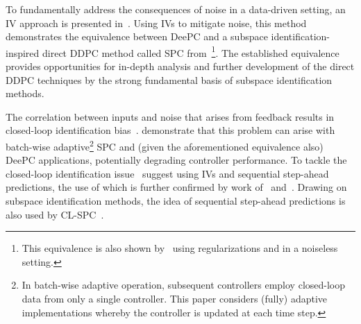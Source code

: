 To fundamentally address the consequences of noise in a data-driven setting, an \ac{IV} approach is presented in~\cite{vanWingerden2022}. %
Using \acs{IVs} to mitigate noise, this method %
demonstrates the equivalence between \ac{DeePC} and a subspace identification-inspired direct \ac{DDPC} method called \ac{SPC} from~\cite{Favoreel1999}\footnote{This equivalence is also shown by~\cite{Fiedler2021} using regularizations and in a noiseless setting.}. The established equivalence provides opportunities for in-depth analysis and further development of the direct \ac{DDPC} techniques by the strong fundamental basis of subspace identification methods. %

The correlation between inputs and noise that arises from feedback results in closed-loop identification bias~\citep{Ljung1996}. %
\cite{Dinkla2023} demonstrate that this problem can arise with batch-wise adaptive\footnote{In batch-wise adaptive operation, subsequent controllers employ closed-loop data from only a single controller. This paper considers (fully) adaptive implementations whereby the controller is updated at each time step.} \ac{SPC} and (given the aforementioned equivalence also) \ac{DeePC} applications, potentially degrading controller performance. To tackle the closed-loop identification issue~\cite{Dinkla2023} suggest using \ac{IVs} and sequential step-ahead predictions, the use of which is further confirmed by work of~\cite{Wang2023} and~\cite{Shi2023}. Drawing on subspace identification methods, the idea of sequential step-ahead predictions is also used by \acf{CL-SPC}~\citep{Dong2008}. %

